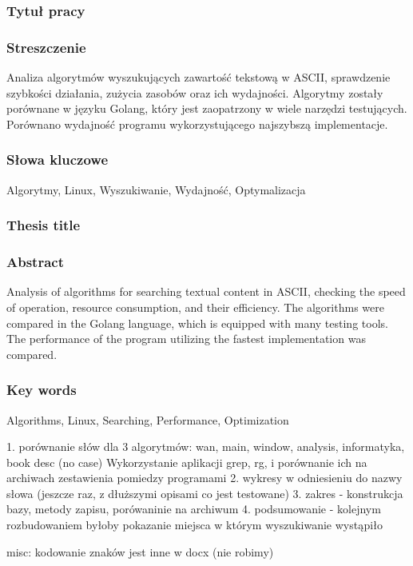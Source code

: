\subsubsection*{Tytuł pracy} 
\Title

\subsubsection*{Streszczenie}  
Analiza algorytmów wyszukujących zawartość tekstową w ASCII, sprawdzenie 
szybkości działania, zużycia zasobów oraz ich wydajności. Algorytmy zostały 
porównane w języku Golang, który jest zaopatrzony w wiele narzędzi testujących.
Porównano wydajność programu wykorzystującego najszybszą implementacje.

\subsubsection*{Słowa kluczowe} 
Algorytmy, Linux, Wyszukiwanie, Wydajność, Optymalizacja

\subsubsection*{Thesis title} 
\begin{otherlanguage}{british}
\TitleAlt
\end{otherlanguage}

\subsubsection*{Abstract} 
\begin{otherlanguage}{british}
Analysis of algorithms for searching textual content in ASCII, checking the 
speed of operation, resource consumption, and their efficiency. The algorithms 
were compared in the Golang language, which is equipped with many testing tools.
The performance of the program utilizing the fastest implementation was compared.

\end{otherlanguage}
\subsubsection*{Key words}  
\begin{otherlanguage}{british}
Algorithms, Linux, Searching, Performance, Optimization
\end{otherlanguage}

1. porównanie słów dla 3 algorytmów:
wan, main, window, analysis, informatyka, book desc (no case)
Wykorzystanie aplikacji grep, rg, i porównanie ich na archiwach
zestawienia pomiedzy programami
2. wykresy w odniesieniu do nazwy słowa (jeszcze raz, z dłuższymi opisami co jest testowane)
3. zakres - konstrukcja bazy, metody zapisu, porówaninie na archiwum
4. podsumowanie - kolejnym rozbudowaniem byłoby pokazanie miejsca w którym wyszukiwanie wystąpiło

misc:
kodowanie znaków jest inne w docx (nie robimy)


